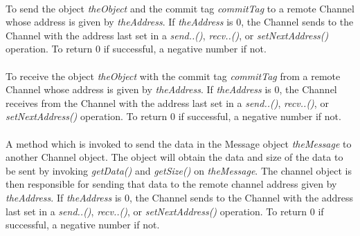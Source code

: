\\
To send the object {\em theObject} and the commit tag {\em commitTag}
to a remote Channel whose address is given by {\em theAddress}. If
{\em theAddress} is $0$, the Channel sends to the Channel with the
address last set in a {\em send..()}, {\em recv..()}, or {\em
setNextAddress()} operation. To return $0$ if successful, a negative
number if not. \\  

\\
To receive the object {\em theObject} with the commit tag {\em commitTag}
from a remote Channel whose address is given by {\em theAddress}. If
{\em theAddress} is $0$, the Channel receives from the Channel with the
address last set in a {\em send..()}, {\em recv..()}, or {\em
setNextAddress()} operation. To return $0$ if successful, a negative
number if not. \\  



\\
A method which is invoked to send the data in the Message object {\em
theMessage} to another Channel object. The object will obtain the
data and size of the data to be sent by invoking {\em getData()} and
{\em getSize()} on {\em theMessage}. The channel object is then
responsible for sending that data to the remote channel address given
by {\em theAddress}. If {\em theAddress} is $0$, the Channel sends to
the Channel with the address last set in a {\em send..()}, {\em
recv..()}, or {\em setNextAddress()} operation. To return $0$ if
successful, a negative number if not. \\  


